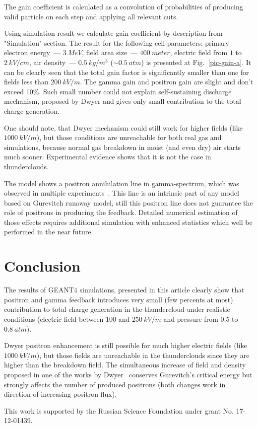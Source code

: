 \documentclass[utf8]{webofc}
\begin{document}
    The gain coefficient is calculated as a convolution of probabilities of producing valid particle on each step and applying all relevant cuts.
    
    Using simulation result we calculate gain coefficient by description from "Simulation" section. The result for the following cell parameters: primary electron energy~--- $3~MeV$, field area size~--- $400~meter$, electric field from $1$ to $2~kV/cm$, air density~--- $0.5~kg/m^3$ ($\sim 0.5~atm$) is presented at Fig.~\ref{pic-gain-a}. It can be clearly seen that the total gain factor is significantly smaller than one for fields less than $200~kV/m$. The gamma gain and positron gain are slight and don't exceed 10\%. Such small number could not explain self-sustaining discharge mechanism, proposed by Dwyer and gives only small contribution to the total charge generation.
    
    One should note, that Dwyer mechanism could still work for higher fields (like $1000~kV/m$), but those conditions are unreachable for both real gas and simulations, because normal gas breakdown in moist (and even dry) air starts much sooner. Experimental evidence shows that it is not the case in thunderclouds.
    
    The model shows a positron annihilation line in gamma-spectrum, which was observed in multiple experiments~\cite{dwyer2015positron}. This line is an intrinsic part of any model based on Gurevitch runaway model, still this positron line does not guarantee the role of positrons in producing the feedback. Detailed numerical estimation of those effects requires additional simulation with enhanced statistics which well be performed in the near future.
    
    \section{Conclusion}
    
    The results of GEANT4 simulations, presented in this article clearly show that positron and gamma feedback introduces very small (few percents at most) contribution to total charge generation in the thundercloud under realistic conditions (electric field between $100$ and $250~kV/m$ and pressure from $0.5$ to $0.8~atm$). 
    
    Dwyer positron enhancement is still possible for much higher electric fields (like $1000~kV/m$), but those fields are unreachable in the thunderclouds since they are higher than the breakdown field. The simultaneous increase of field and density proposed in one of the works by Dwyer~\cite{dwyer2003fundamental} conserves Gurevitch's critical energy but strongly affects the number of produced positrons (both changes work in direction of increasing positron flux).
    
    This work is supported by the Russian Science Foundation under grant No. 17-12-01439.
    
    {}
\end{document}
